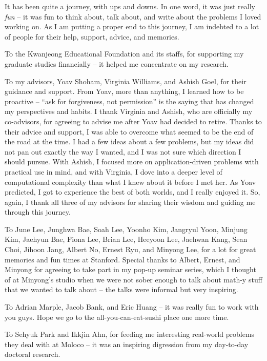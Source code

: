It has been quite a journey, with ups and downs.
In one word, it was just really {\em fun} -- it was fun to think about, talk about, and write about the problems I loved working on. 
As I am putting a proper end to this journey, I am indebted to a lot of people for their help, support, advice, and memories.

To the Kwanjeong Educational Foundation and its staffs, for supporting my graduate studies financially -- it helped me concentrate on my research.

To my advisors, Yoav Shoham, Virginia Williams, and Ashish Goel, for their guidance and support. From Yoav, more than anything, I learned how to be proactive -- ``ask for forgiveness, not permission'' is the saying that has changed my perspectives and habits. I thank Virginia and Ashish, who are officially my co-advisors, for agreeing to advise me after Yoav had decided to retire. Thanks to their advice and support, I was able to overcome what seemed to be the end of the road at the time. I had a few ideas about a few problems, but my ideas did not pan out exactly the way I wanted, and I was not sure which direction I should pursue. With Ashish, I focused more on application-driven problems with practical use in mind, and with Virginia, I dove into a deeper level of computational complexity than what I knew about it before I met her. As Yoav predicted, I got to experience the best of both worlds, and I really enjoyed it. So, again, I thank all three of my advisors for sharing their wisdom and guiding me through this journey.

To June Lee, Junghwa Bae, Soah Lee, Yoonho Kim, Jangryul Yoon, Minjung Kim, Jaehyun Bae, Fiona Lee, Brian Lee, Heeyoon Lee, Jaehwan Kang, Sean Choi, Jihoon Jang, Albert No, Ernest Ryu, and Minyong Lee, for a lot for great memories and fun times at Stanford. Special thanks to Albert, Ernest, and Minyong for agreeing to take part in my pop-up seminar series, which I thought of at Minyong's studio when we were not sober enough to talk about math-y stuff that we wanted to talk about -- the talks were informal but very inspiring. 

To Adrian Marple, Jacob Bank, and Eric Huang -- it was really fun to work with you guys. Hope we go to the all-you-can-eat-sushi place one more time.

To Sehyuk Park and Ikkjin Ahn, for feeding me interesting real-world problems they deal with at Moloco -- it was an inspiring digression from my day-to-day doctoral research.

